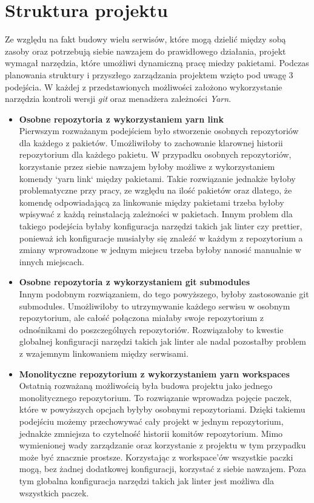 \section{Struktura projektu}
Ze względu na fakt budowy wielu serwisów, które mogą dzielić między sobą zasoby oraz potrzebują siebie nawzajem do prawidłowego działania, projekt wymagał narzędzia, które umożliwi dynamiczną pracę miedzy pakietami. Podczas planowania struktury i przyszłego zarządzania projektem wzięto pod uwagę 3 podejścia. W każdej z przedstawionych możliwości założono wykorzystanie narzędzia kontroli wersji \textit{git} oraz menadżera zależności \textit{Yarn}.

\begin{itemize}
    \item \textbf {Osobne repozytoria z wykorzystaniem yarn link} \\
        Pierwszym rozważanym podejściem było stworzenie osobnych repozytoriów dla każdego z pakietów.
        Umożliwiłoby to zachowanie klarownej historii repozytorium dla każdego pakietu. W przypadku osobnych repozytoriów, korzystanie przez siebie nawzajem byłoby możliwe z wykorzystaniem komendy `yarn link` między pakietami. Takie rozwiązanie jednakże byłoby problematyczne przy pracy, ze względu na ilość pakietów oraz dlatego, że komendę odpowiadającą za linkowanie między pakietami trzeba byłoby wpisywać z każdą reinstalacją zależności w pakietach. Innym problem dla takiego podejścia byłaby konfiguracja narzędzi takich jak linter czy prettier, ponieważ ich konfiguracje musiałyby się znaleźć w każdym z repozytorium a zmiany wprowadzone w jednym miejscu trzeba byłoby nanosić manualnie w innych miejscach. \cite{YarnLinkDocs}

    \item \textbf {Osobne repozytoria z wykorzystaniem git submodules} \\
        Innym podobnym rozwiązaniem, do tego powyższego, byłoby zastosowanie git submodules. Umożliwiłoby to utrzymywanie każdego serwisu w osobnym repozytorium, ale całość połączona miałaby swoje repozytorium z odnośnikami do poszczególnych repozytoriów. Rozwiązałoby to kwestie globalnej konfiguracji narzędzi takich jak linter ale nadal pozostałby problem z wzajemnym linkowaniem między serwisami. \cite{GitSubmodulesDocs}

    \item \textbf {Monolityczne repozytorium z wykorzystaniem yarn workspaces} \\
        Ostatnią rozważaną możliwością była budowa projektu jako jednego monolitycznego repozytorium. To rozwiązanie wprowadza pojęcie paczek, które w powyższych opcjach byłyby osobnymi repozytoriami. Dzięki takiemu podejściu możemy przechowywać cały projekt w jednym repozytorium, jednakże zmniejsza to czytelność historii komitów repozytorium. Mimo wymienionej wady zarządzanie oraz korzystanie z projektu w tym przypadku może być znacznie prostsze. Korzystając z workspace'ów wszystkie paczki mogą, bez żadnej dodatkowej konfiguracji, korzystać z siebie nawzajem. Poza tym globalna konfiguracja narzędzi takich jak linter jest możliwa dla wszystkich paczek. \cite{YarnWorkspacesDocs}

\end{itemize}

